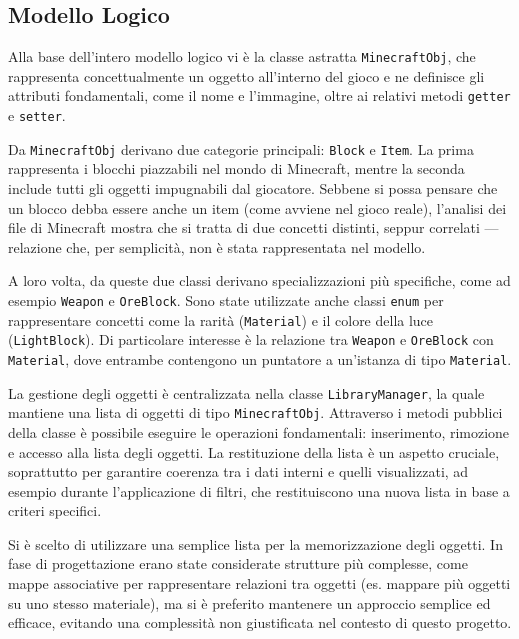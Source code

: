 \documentclass[12pt]{article}
\begin{document}
\subsection{Modello Logico}

Alla base dell'intero modello logico vi è la classe astratta \texttt{MinecraftObj}, che rappresenta concettualmente un oggetto all’interno del gioco e ne definisce gli attributi fondamentali, come il nome e l’immagine, oltre ai relativi metodi \texttt{getter} e \texttt{setter}.

Da \texttt{MinecraftObj} derivano due categorie principali: \texttt{Block} e \texttt{Item}.  
La prima rappresenta i blocchi piazzabili nel mondo di Minecraft, mentre la seconda include tutti gli oggetti impugnabili dal giocatore.  
Sebbene si possa pensare che un blocco debba essere anche un item (come avviene nel gioco reale), l’analisi dei file di Minecraft mostra che si tratta di due concetti distinti, seppur correlati — relazione che, per semplicità, non è stata rappresentata nel modello.

A loro volta, da queste due classi derivano specializzazioni più specifiche, come ad esempio \texttt{Weapon} e \texttt{OreBlock}.  
Sono state utilizzate anche classi \texttt{enum} per rappresentare concetti come la rarità (\texttt{Material}) e il colore della luce (\texttt{LightBlock}).  
Di particolare interesse è la relazione tra \texttt{Weapon} e \texttt{OreBlock} con \texttt{Material}, dove entrambe contengono un puntatore a un’istanza di tipo \texttt{Material}.

La gestione degli oggetti è centralizzata nella classe \texttt{LibraryManager}, la quale mantiene una lista di oggetti di tipo \texttt{MinecraftObj}.  
Attraverso i metodi pubblici della classe è possibile eseguire le operazioni fondamentali: inserimento, rimozione e accesso alla lista degli oggetti.  
La restituzione della lista è un aspetto cruciale, soprattutto per garantire coerenza tra i dati interni e quelli visualizzati, ad esempio durante l'applicazione di filtri, che restituiscono una nuova lista in base a criteri specifici.

Si è scelto di utilizzare una semplice lista per la memorizzazione degli oggetti. In fase di progettazione erano state considerate strutture più complesse, come mappe associative per rappresentare relazioni tra oggetti (es. mappare più oggetti su uno stesso materiale), ma si è preferito mantenere un approccio semplice ed efficace, evitando una complessità non giustificata nel contesto di questo progetto.
\end{document}
